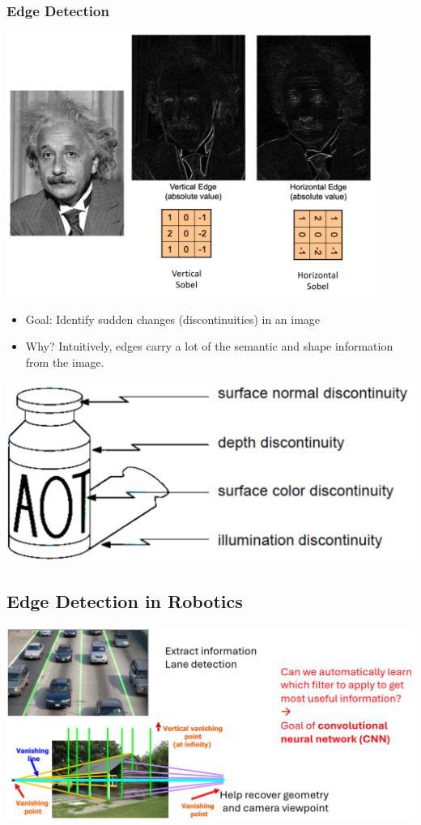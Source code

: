 \documentclass[10pt]{article}
\begin{document}
\subsubsection*{Edge Detection}
\begin{center} 
	\includegraphics*[width=0.9\textwidth]{L2_14.png} 
\end{center}
\begin{itemize}
	\item Goal: Identify sudden changes (discontinuities) in an image
	\item Why?  Intuitively, edges carry a lot of the semantic and shape information from the image.
\end{itemize}
\begin{center} 
	\includegraphics*[width=\textwidth]{L2_15.png} 
\end{center}

\subsection*{Edge Detection in Robotics}
\begin{center} 
	\includegraphics*[width=\textwidth]{L2_16.png} 
\end{center}
\end{document}
